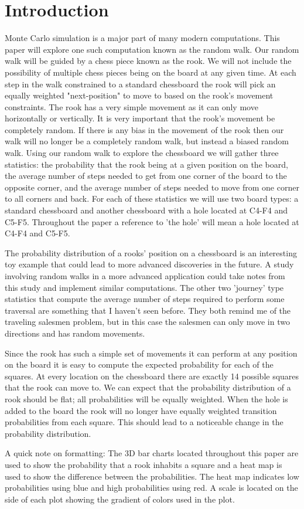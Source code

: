 \documentclass{amsart}
\numberwithin{equation}{section}
\begin{document}
\section{Introduction}
Monte Carlo simulation is a major part of many modern computations. This paper will explore one such computation known as the random walk. Our random walk will be guided by a chess piece known as the rook. We will not include the possibility of multiple chess pieces being on the board at any given time. At each step in the walk constrained to a standard chessboard the rook will pick an equally weighted "next-position" to move to based on the rook's movement constraints. The rook has a very simple movement as it can only move horizontally or vertically. It is very important that the rook's movement be completely random. If there is any bias in the movement of the rook then our walk will no longer be a completely random walk, but instead a biased random walk. Using our random walk to explore the chessboard we will gather three statistics: the probability that the rook being at a given position on the board, the average number of steps needed to get from one corner of the board to the opposite corner, and the average number of steps needed to move from one corner to all corners and back. For each of these statistics we will use two board types: a standard chessboard and another chessboard with a hole located at C4-F4 and C5-F5. Throughout the paper a reference to 'the hole' will mean a hole located at C4-F4 and C5-F5. \par 
The probability distribution of a rooks' position on a chessboard is an interesting toy example that could lead to more advanced discoveries in the future. A study involving random walks in a more advanced application could take notes from this study and implement similar computations. The other two 'journey' type statistics that compute the average number of steps required to perform some traversal are something that I haven't seen before. They both remind me of the traveling salesmen problem, but in this case the salesmen can only move in two directions and has random movements. \par 
Since the rook has such a simple set of movements it can perform at any position on the board it is easy to compute the expected probability for each of the squares. At every location on the chessboard there are exactly 14 possible squares that the rook can move to. We can expect that the probability distribution of a rook should be flat; all probabilities will be equally weighted. When the hole is added to the board the rook will no longer have equally weighted transition probabilities from each square. This should lead to a noticeable change in the probability distribution. \par
A quick note on formatting: The 3D bar charts located throughout this paper are used to show the probability that a rook inhabits a square and a heat map is used to show the difference between the probabilities. The heat map indicates low probabilities using blue and high probabilities using red. A scale is located on the side of each plot showing the gradient of colors used in the plot. 
\end{document}
